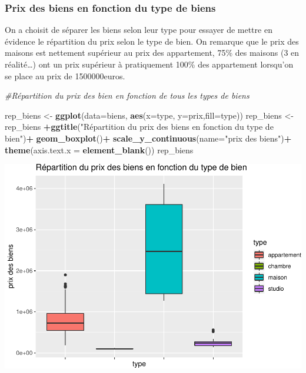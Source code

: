 \documentclass[french,]{article}
\newenvironment{Shaded}{\begin{snugshade}}{\end{snugshade}}
\newcommand{\CommentTok}[1]{\textcolor[rgb]{0.56,0.35,0.01}{\textit{#1}}}
\newcommand{\DataTypeTok}[1]{\textcolor[rgb]{0.13,0.29,0.53}{#1}}
\newcommand{\KeywordTok}[1]{\textcolor[rgb]{0.13,0.29,0.53}{\textbf{#1}}}
\newcommand{\NormalTok}[1]{#1}
\newcommand{\OperatorTok}[1]{\textcolor[rgb]{0.81,0.36,0.00}{\textbf{#1}}}
\newcommand{\StringTok}[1]{\textcolor[rgb]{0.31,0.60,0.02}{#1}}
\begin{document}
\hypertarget{prix-des-biens-en-fonction-du-type-de-biens}{%
\subsubsection{Prix des biens en fonction du type de
biens}\label{prix-des-biens-en-fonction-du-type-de-biens}}

On a choisit de séparer les biens selon leur type pour essayer de mettre
en évidence le répartition du prix selon le type de bien. On remarque
que le prix des maisons est nettement supérieur au prix des appartement,
75\% des maisons (3 en réalité\ldots{}) ont un prix supérieur à
pratiquement 100\% des appartement lorsqu'on se place au prix de
1500000euros.

\begin{Shaded}
\begin{Highlighting}[]
\CommentTok{#Répartition du prix des bien en fonction de tous les types de biens}

\NormalTok{rep_biens <-}\StringTok{ }\KeywordTok{ggplot}\NormalTok{(}\DataTypeTok{data=}\NormalTok{biens, }\KeywordTok{aes}\NormalTok{(}\DataTypeTok{x=}\NormalTok{type, }\DataTypeTok{y=}\NormalTok{prix,}\DataTypeTok{fill=}\NormalTok{type))}
\NormalTok{rep_biens <-}\StringTok{ }\NormalTok{rep_biens }\OperatorTok{+}\KeywordTok{ggtitle}\NormalTok{(}\StringTok{"Répartition du prix des biens en fonction du type de bien"}\NormalTok{)}\OperatorTok{+}\StringTok{ }\KeywordTok{geom_boxplot}\NormalTok{()}\OperatorTok{+}\StringTok{ }\KeywordTok{scale_y_continuous}\NormalTok{(}\DataTypeTok{name=}\StringTok{"prix des biens"}\NormalTok{)}\OperatorTok{+}\StringTok{ }\KeywordTok{theme}\NormalTok{(}\DataTypeTok{axis.text.x =} \KeywordTok{element_blank}\NormalTok{())}
\NormalTok{rep_biens}
\end{Highlighting}
\end{Shaded}

\includegraphics{Projet_files/figure-latex/unnamed-chunk-25-1.pdf}
\end{document}

